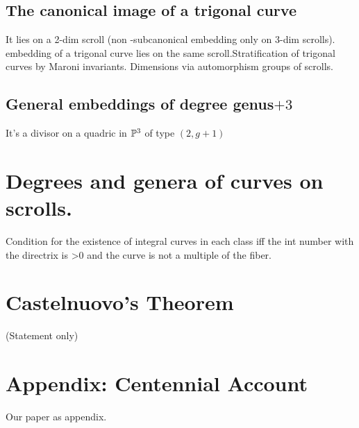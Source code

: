 \subsection{The canonical image of a trigonal curve}
It lies on a 2-dim scroll (non -subcanonical embedding only on 3-dim scrolls).  embedding of a trigonal curve lies on the same scroll.Stratification of trigonal curves by Maroni invariants. Dimensions via automorphism groups of scrolls.

\subsection{General embeddings of degree
genus$+3$} 

It's a divisor on a quadric in $\PP^{3}$ of type $(2,g+1)$

\section{Degrees and genera of curves on scrolls.} Condition for the existence of integral curves in each class iff the int number with the directrix is >0 and the curve is not a multiple of the fiber. 

\section{Castelnuovo's Theorem}
(Statement only)

\section{Appendix: Centennial Account}
Our paper as appendix.
